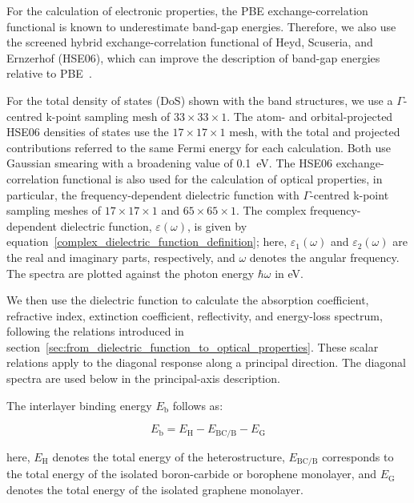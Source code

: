 For the calculation of electronic properties,
the PBE exchange-correlation functional is known to underestimate band-gap energies.
Therefore, we also use the screened hybrid exchange-correlation functional of Heyd, Scuseria, and Ernzerhof (HSE06),
which can improve the description of band-gap energies relative to PBE~\cite{sassnick2021electronic, heyd2003hybrid, krukau2006influence}.

For the total density of states (DoS) shown with the band structures,
we use a $\Gamma$-centred k-point sampling mesh of $33 \times 33 \times 1$.
The atom- and orbital-projected HSE06 densities of states use the $17 \times 17 \times 1$ mesh,
with the total and projected contributions referred to the same Fermi energy for each calculation.
Both use Gaussian smearing with a broadening value of \qty{0.1}{\electronvolt}.
The HSE06 exchange-correlation functional is also used for the calculation of optical properties,
in particular, the frequency-dependent dielectric function with $\Gamma$-centred k-point sampling meshes of $17 \times 17 \times 1$ and $65 \times 65 \times 1$.
The complex frequency-dependent dielectric function, $\varepsilon(\omega)$,
is given by equation~\eqref{complex_dielectric_function_definition};
here, $\varepsilon_{1}(\omega)$ and $\varepsilon_{2}(\omega)$ are the real and imaginary parts, respectively, and $\omega$ denotes the angular frequency.
The spectra are plotted against the photon energy $\hbar\omega$ in \unit{\electronvolt}.

We then use the dielectric function to calculate the absorption coefficient,
refractive index, extinction coefficient, reflectivity, and energy-loss spectrum,
following the relations introduced in section~\ref{sec:from_dielectric_function_to_optical_properties}.
These scalar relations apply to the diagonal response along a principal direction.
The diagonal spectra are used below in the principal-axis description.

The interlayer binding energy $E_{\mathrm{b}}$ follows as:

\begin{equation}
E_{\mathrm{b}}
= E_{\mathrm{H}} - E_{\mathrm{BC}/\mathrm{B}} - E_{\mathrm{G}}
\label{interlayer_binding_energy}
\end{equation}

here, $E_{\mathrm{H}}$ denotes the total energy of the heterostructure,
$E_{\mathrm{BC}/\mathrm{B}}$ corresponds to the total energy of the isolated boron-carbide or borophene monolayer,
and $E_{\mathrm{G}}$ denotes the total energy of the isolated graphene monolayer.

